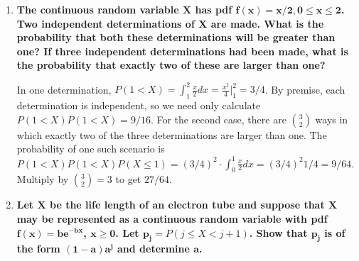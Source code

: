 \documentclass[10pt, oneside]{article}   	%
\theoremstyle{definition}
\begin{document}
\begin{enumerate}[label=4.\arabic*]
\begin{enumerate}
\begin{proof}
	\end{proof}
	
	\item  \begin{tcolorbox}[
	  colback=Cerulean!5!white,
	  colframe=Cerulean!75!black]
	\textbf{Show that if $\bm{np - (1 - p) < 0}$, $\bm{p_n(0) > p_n(1) > \cdots > p_n(n)}$ while if $\bm{np - (1-p) = 0, p_n(0) = p_n(1) > p_n(2) > \cdots > p_n(n)}$.}
	\end{tcolorbox}
	
	\begin{proof}
	In the first case, apply (b)(iii) and since $k \geq 0 > np - (1-p)$, for $k = 0$ we have $p_n(0) > p_n(1)$, for $k=1$, $p_n(1) > p_n(2)$, and so-on-and-so-forth until $k = n-1$, $p_n (n-1) > p_n(n)$, establishing the result. In the second case, apply (b)(ii) for $k = np - (1-p) = 0$, therefore $p_n (0) = p_n(1)$, and for $k > np - (1-p) = 0$, apply (b)(iii) to get the desired result.
	\end{proof}

	\end{enumerate}

\item  \begin{tcolorbox}[
  colback=Cerulean!5!white,
  colframe=Cerulean!75!black]
\textbf{The continuous random variable $\bm{X}$ has pdf $\bm{f(x) = x/2, 0 \leq x \leq 2}$. Two independent determinations of $\bm{X}$ are made. What is the probability that both these determinations will be greater than one? If three independent determinations had been made, what is the probability that exactly two of these are larger than one?}
\end{tcolorbox}

In one determination, $P(1 < X) = \int^2_1 \frac{x}{2}dx = \frac{x^2}{4} \Big|^2_1 = 3/4$. By premise, each determination is independent, so we need only calculate $P(1 < X) P(1 < X) = \boxed{9/16}$. For the second case, there are $\binom{3}{2}$ ways in which exactly two of the three determinations are larger than one. The probability of one such scenario is $P(1 < X) P(1 < X) P(X \leq 1) = (3/4)^2 \cdot \int^1_0 \frac{x}{2}dx = (3/4)^2 1/4 = 9/64$. Multiply by $\binom{3}{2} = 3$ to get $\boxed{27/64}$. 

\item  \begin{tcolorbox}[
  colback=Cerulean!5!white,
  colframe=Cerulean!75!black]
\textbf{Let $\bm{X}$ be the life length of an electron tube and suppose that $\bm{X}$ may be represented as a continuous random variable with pdf $\bm{f(x) = be^{-bx}}$, $\bm{x \geq 0}$. Let $\bm{p_j} = P(j \leq X < j + 1)$. Show that $\bm{p_j}$ is of the form $\bm{(1-a)a^j}$ and determine $\bm{a}$.}
\end{tcolorbox}


\end{enumerate}
\end{document}
